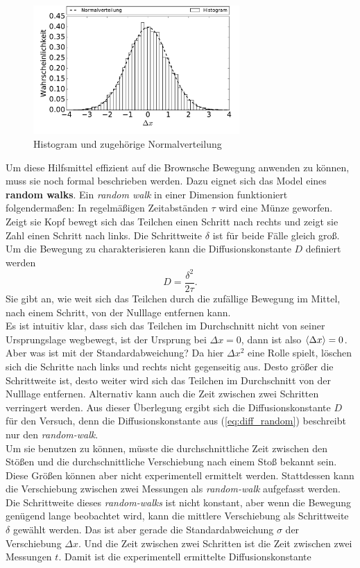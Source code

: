 \begin{figure}[h!]
  \centering
  \includegraphics[width=0.7\textwidth]{figures/histogram}
  \caption{Histogram und zugehörige Normalverteilung}\label{fig:histo}
\end{figure}
Um diese Hilfsmittel effizient auf die Brownsche Bewegung anwenden zu können, muss sie noch formal beschrieben werden. Dazu eignet sich das Model eines \textbf{random walks}. Ein \emph{random walk} in einer Dimension funktioniert folgendermaßen: In regelmäßigen Zeitabständen $\tau$ wird eine Münze geworfen. Zeigt sie Kopf bewegt sich das Teilchen einen Schritt nach rechts und zeigt sie Zahl einen Schritt nach links. Die Schrittweite $\delta$ ist für beide Fälle gleich groß. Um die Bewegung zu charakterisieren kann die Diffusionskonstante $D$ definiert werden
\begin{equation}
  D = \frac{\delta^2}{2 \tau}. \label{eq:diff_random}
\end{equation}
Sie gibt an, wie weit sich das Teilchen durch die zufällige Bewegung im Mittel, nach einem Schritt, von der Nulllage entfernen kann.\\
Es ist intuitiv klar, dass sich das Teilchen im Durchschnitt nicht von seiner Ursprungslage wegbewegt, ist der Ursprung bei $\Delta x = 0$, dann ist also $\left< \Delta x \right> = 0$. Aber was ist mit der Standardabweichung? Da hier $\Delta x^2$ eine Rolle spielt, löschen sich die Schritte nach links und rechts nicht gegenseitig aus.
Desto größer die Schrittweite ist, desto weiter wird sich das Teilchen im Durchschnitt von der Nulllage entfernen. Alternativ kann auch die Zeit zwischen zwei Schritten verringert werden. Aus dieser Überlegung ergibt sich die Diffusionskonstante $D$ für den Versuch, denn die Diffusionskonstante aus (\ref{eq:diff_random}) beschreibt nur den \emph{random-walk}.\\
Um sie benutzen zu können, müsste die durchschnittliche Zeit zwischen den Stößen und die durchschnittliche Verschiebung nach einem Stoß bekannt sein. Diese Größen können aber nicht experimentell ermittelt werden. Stattdessen kann die Verschiebung zwischen zwei Messungen als \emph{random-walk} aufgefasst werden. Die Schrittweite dieses \emph{random-walks} ist nicht konstant, aber wenn die Bewegung genügend lange beobachtet wird, kann die mittlere Verschiebung als Schrittweite $\delta$ gewählt werden. Das ist aber gerade die Standardabweichung $\sigma$ der Verschiebung $\Delta x$. Und die Zeit zwischen zwei Schritten ist die Zeit zwischen zwei Messungen $t$. Damit ist die experimentell ermittelte Diffusionskonstante
